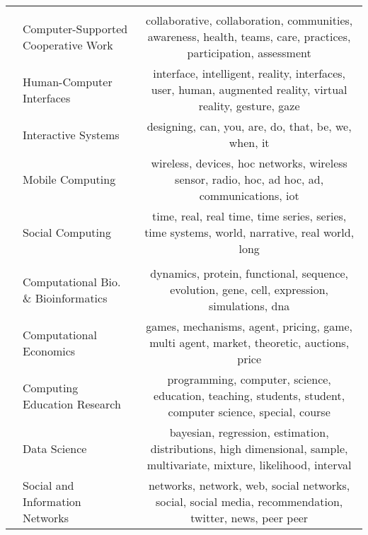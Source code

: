 \documentclass[reprint, twocolumn, aps, nofootinbib, superscriptaddress, longbibliography]{revtex4-1}
\begin{document}
\begin{table*}
\begin{tabularx}{\textwidth}{llC}
       &                                          &                                                                                                                                    \\
                              &         Computer-Supported Cooperative Work &                       collaborative, collaboration, communities, awareness, health, teams, care, practices, participation, assessment \\
                              &                   Human-Computer Interfaces &                           interface, intelligent, reality, interfaces, user, human, augmented reality, virtual reality, gesture, gaze \\
                              &                         Interactive Systems &                                                                                  designing, can, you, are, do, that, be, we, when, it \\
                              &                            Mobile Computing &                                         wireless, devices, hoc networks, wireless sensor, radio, hoc, ad hoc, ad, communications, iot \\
                              &                            Social Computing &                                          time, real, real time, time series, series, time systems, world, narrative, real world, long \\
                              \midrule

      &                                          &                                                                                                                                    \\
                              &         Computational Bio. \& Bioinformatics &                                          dynamics, protein, functional, sequence, evolution, gene, cell, expression, simulations, dna \\
                              &                     Computational Economics &                                              games, mechanisms, agent, pricing, game, multi agent, market, theoretic, auctions, price \\
                              &                Computing Education Research &                             programming, computer, science, education, teaching, students, student, computer science, special, course \\
                              &                                Data Science &                bayesian, regression, estimation, distributions, high dimensional, sample, multivariate, mixture, likelihood, interval \\
                              &             Social and Information Networks &                               networks, network, web, social networks, social, social media, recommendation, twitter, news, peer peer \\
                              \midrule


\end{tabularx}
\end{table*}
\end{document}
